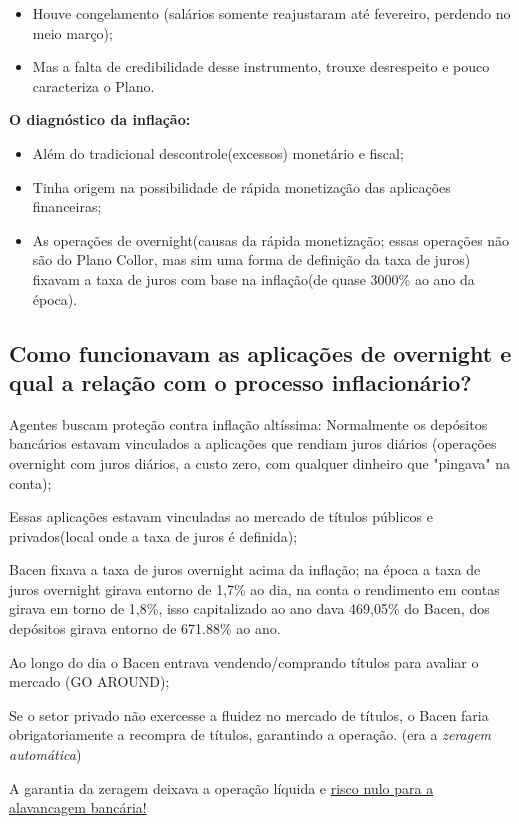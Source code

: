 \documentclass[a4paper,12pt]{article}[abntex2]
\begin{document}
\begin{itemize}
    \item Houve congelamento (salários somente reajustaram até fevereiro, perdendo no meio março);
    \item Mas a falta de credibilidade desse instrumento, trouxe desrespeito e pouco caracteriza o Plano.
\end{itemize}

\textbf{O diagnóstico da inflação:}
\begin{itemize}
    \item Além do tradicional descontrole(excessos) monetário e fiscal;
    \item Tinha origem na possibilidade de rápida monetização das aplicações financeiras;
    \item As operações de overnight(causas da rápida monetização; essas operações não são do Plano Collor, mas sim uma forma de definição da taxa de juros) fixavam a taxa de juros com base na inflação(de quase 3000\% ao ano da época).
\end{itemize}

\subsection{\textbf{Como funcionavam as aplicações de overnight e qual a relação com o processo inflacionário?}}
Agentes buscam proteção contra inflação altíssima: Normalmente os depósitos bancários estavam vinculados a aplicações que rendiam juros diários (operações overnight com juros diários, a custo zero, com qualquer dinheiro que "pingava" na conta);

Essas aplicações estavam vinculadas ao mercado de títulos públicos e privados(local onde a taxa de juros é definida);

Bacen fixava a taxa de juros overnight acima da inflação; na época a taxa de juros overnight girava entorno de 1,7\% ao dia, na conta o rendimento em contas girava em torno de 1,8\%, isso capitalizado ao ano dava 469,05\% do Bacen, dos depósitos girava entorno de 671.88\% ao ano.

Ao longo do dia o Bacen entrava vendendo/comprando títulos para avaliar o mercado (GO AROUND);

Se o setor privado não exercesse a fluidez no mercado de títulos, o Bacen faria obrigatoriamente a recompra de títulos, garantindo a operação. (era a \textit{zeragem automática})

A garantia da zeragem deixava a operação líquida e \underline{risco nulo para a alavancagem bancária!}
\end{document}

